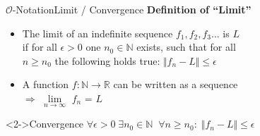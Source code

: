 \begin{frame}{$\mathcal{O}$-Notation}{Limit / Convergence}
  \textbf{Definition of \enquote{Limit}}
  \begin{itemize}
    \item
      The limit of an indefinite sequence $f_1, f_2, f_3$... is $L$\\
      if for all $\epsilon > 0$ one $n_0 \in \mathbb{N}$ exists, such that for all \\
      $n \geq n_0$ the following holds true: $\Vert f_n - L \Vert \leq \epsilon$
    \item
      A function $f\!: \mathbb{N} \rightarrow \mathbb{R}$ can be written as a
      sequence\\
      $\Rightarrow$ $\lim\limits_{n \rightarrow \infty}$ $f_n$ = $L$
  \end{itemize}
  \begin{block}<2->{Convergence}
    \begin{math}
      \forall \epsilon > 0 \; \exists n_0 \in \mathbb{N} \;\;
      \forall n \geq n_0 \! : \; \Vert f_n - L \Vert \leq \epsilon
    \end{math}
  \end{block}
\end{frame}



